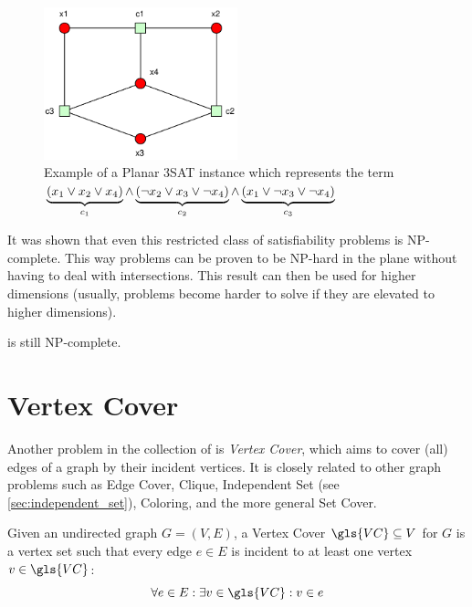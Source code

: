 \begin{figure}[ht]
  \centering
  \includegraphics[width=0.5\textwidth]{img/example_planar_3SAT.pdf}
  \caption{\label{fig:example_planar_3SAT}Example of a Planar 3SAT %
    instance which represents the term \(%
      \protect\underbrace{(x_1 \lor x_2 \lor x_4)}_{c_1}\land%
      \protect\underbrace{(\lnot x_2 \lor x_3 \lor \lnot x_4)}_{c_2}\land%
      \protect\underbrace{(x_1 \lor \lnot x_3 \lor \lnot x_4)}_{c_3}%
    \)}
\end{figure}

It was shown that even this restricted class of satisfiability
problems is NP-complete. This way problems can be proven to be
NP-hard in the plane without having to deal with intersections. This
result can then be used for higher dimensions (usually, problems
become harder to solve if they are elevated to higher dimensions).

\begin{theorem}
   is still NP-complete.~\cite{planar_3SAT}
\end{theorem}

\section{Vertex Cover}
\label{sec:vertex_cover}
Another problem in the collection of \cite{karp_np_complete} is
\emph{Vertex Cover}, which aims to cover (all) edges of a graph by
their incident vertices. It is closely related to other graph problems
such as Edge Cover, Clique, Independent Set
(see \cref{sec:independent_set}), Coloring, and the more general Set
Cover.

\begin{definition}
  \label{def:vertex_cover}
  Given an undirected graph \(G=(V,E)\), a Vertex Cover
  \(\gls{VC} \subseteq V\) for \(G\) is a vertex set such that
  every edge \(e \in E\) is incident to at least one vertex
  \(v \in \gls{VC}\):
  \[ \forall e \in E: \exists v \in \gls{VC}: v \in e \]
\end{definition}

